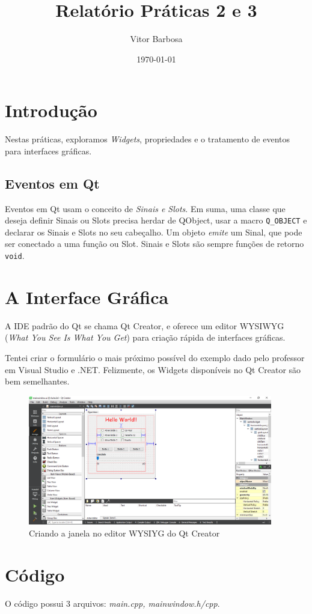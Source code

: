 \documentclass[12pt,a4paper]{article}
\title{Relatório Práticas 2 e 3}
\author{Vitor Barbosa}
\date{\today}
\begin{document}
\maketitle
\section{Introdução}
Nestas práticas, exploramos \emph{Widgets}, propriedades e o tratamento de eventos para interfaces gráficas.
\subsection{Eventos em Qt}
Eventos em Qt usam o conceito de \emph{Sinais e Slots}.
Em suma, uma classe que deseja definir Sinais ou Slots precisa herdar de QObject, usar a macro \texttt{Q\_OBJECT} e declarar os Sinais e Slots no seu cabeçalho.
Um objeto \emph{emite} um Sinal, que pode ser conectado a uma função ou Slot.
Sinais e Slots são sempre funções de retorno \texttt{void}.

\section{A Interface Gráfica}
A IDE padrão do Qt se chama Qt Creator, e oferece um editor WYSIWYG (\emph{What You See Is What You Get}) para criação rápida de interfaces gráficas.

Tentei criar o formulário o mais próximo possível do exemplo dado pelo professor em Visual Studio e .NET. Felizmente, os Widgets disponíveis no Qt Creator são bem semelhantes.
\begin{figure}[H]
    \centering
	\includegraphics[width=0.95\textwidth]{wysiwyg}
\caption{Criando a janela no editor WYSIYG do Qt Creator}
\end{figure}

\section{Código}
O código possui 3 arquivos: \emph{main.cpp, mainwindow.h/cpp}.
\end{document}
